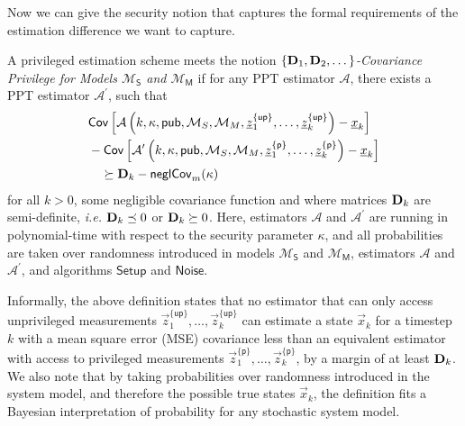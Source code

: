 Now we can give the security notion that captures the formal requirements of the estimation difference we want to capture.
\begin{definition}\label{def:priv_estimation:covariance_privilege_notion}
    A privileged estimation scheme meets the notion \textit{$\{{{\mathbf{D}}}_1,{{\mathbf{D}}}_2,\dots\}$-Covariance Privilege for Models $\mathcal{M}_{\mathsf{S}}$ and $\mathcal{M}_{\mathsf{M}}$} if for any PPT estimator $\mathcal{A}$, there exists a PPT estimator $\mathcal{A}^\prime$, such that
    \begin{equation}\label{eq:priv_estimation:covariance_privilege}
        \begin{split}
            &\mathsf{Cov}\left[\mathcal{A}\left(k, \kappa, \mathsf{pub}, \mathcal{M}_S, \mathcal{M}_M, {\underline{z}}_1^{\{\mathsf{up}\}},\dots,{\underline{z}}_k^{\{\mathsf{up}\}}\right) - {\underline{x}}_k \right]\\
            &-\mathsf{Cov}\left[\mathcal{A}^\prime\left(k, \kappa, \mathsf{pub}, \mathcal{M}_S, \mathcal{M}_M, {\underline{z}}_1^{\{\mathsf{p}\}},\dots,{\underline{z}}_k^{\{\mathsf{p}\}}\right) - {\underline{x}}_k \right]\\
            &\quad\succeq {\ensuremath{{\mathbf{D}}}}_k - \mathsf{neglCov}_m(\kappa)
        \end{split}
    \end{equation}
   for all $k>0$, some negligible covariance function and where matrices ${{\mathbf{D}}}_k$ are semi-definite, \textit{i.e.} ${{\mathbf{D}}}_k\preceq 0$ or ${{\mathbf{D}}}_k\succeq 0$. Here, estimators $\mathcal{A}$ and $\mathcal{A}^\prime$ are running in polynomial-time with respect to the security parameter $\kappa$, and all probabilities are taken over randomness introduced in models $\mathcal{M}_{\mathsf{S}}$ and $\mathcal{M}_{\mathsf{M}}$, estimators $\mathcal{A}$ and $\mathcal{A}^\prime$, and algorithms $\mathsf{Setup}$ and $\mathsf{Noise}$.
\end{definition}

Informally, the above definition states that no estimator that can only access unprivileged measurements $\vec{z}_1^{\{\mathsf{up}\}},\dots,\vec{z}_k^{\{\mathsf{up}\}}$ can estimate a state $\vec{x}_k$ for a timestep $k$ with a mean square error (MSE) covariance less than an equivalent estimator with access to privileged measurements $\vec{z}_1^{\{\mathsf{p}\}},\dots,\vec{z}_k^{\{\mathsf{p}\}}$, by a margin of at least ${{\mathbf{D}}}_k$. We also note that by taking probabilities over randomness introduced in the system model, and therefore the possible true states $\vec{x}_k$, the definition fits a Bayesian interpretation of probability for any stochastic system model.

